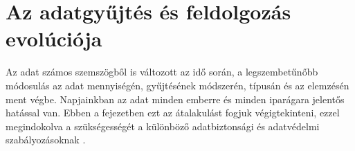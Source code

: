 \chapter{Az adatgyűjtés és feldolgozás evolúciója}

Az adat számos szemszögből is változott az idő során, a legszembetűnőbb módosulás az adat mennyiségén, gyűjtésének módszerén, típusán és az elemzésén ment végbe. Napjainkban az adat minden emberre és minden iparágara jelentős hatással van. Ebben a fejezetben ezt az átalakulást fogjuk végigtekinteni, ezzel megindokolva a szükségességét a különböző adatbiztonsági és adatvédelmi szabályozásoknak \cite{villanova-university-2020,gutcheck-2020}.



